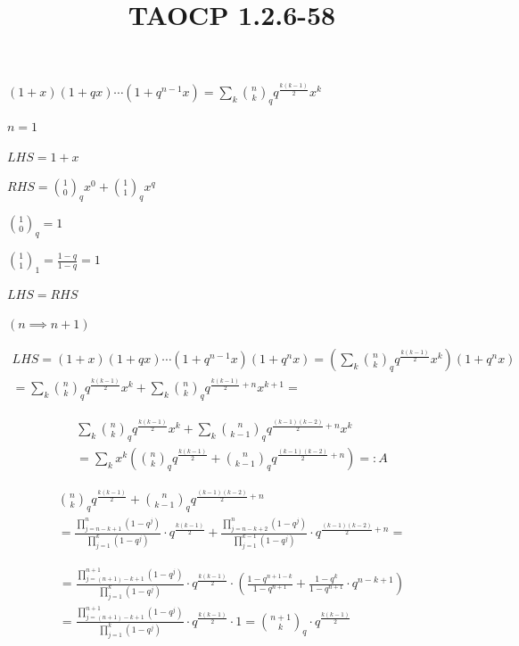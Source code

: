 \documentclass{article}
\title{TAOCP 1.2.6\mbox{-}58}
\begin{document}
\maketitle

\( (1+x)(1+qx)\cdots(1+q^{n-1}x) = \sum_{k} \binom{n}{k}_{q} q^{\frac{k(k-1)}{2}} x^{k} \)

\( n = 1 \)

\( LHS = 1 + x \)

\( RHS = \binom{1}{0}_{q} x^{0} + \binom{1}{1}_{q} x^{q} \)

\( \binom{1}{0}_{q} = 1 \)

\( \binom{1}{1}_{1} = \frac{1-q}{1-q} = 1 \)

\( LHS = RHS \)

\( (n \implies n + 1) \)

\begin{multline*}
LHS = (1+x)(1+qx)\cdots(1+q^{n-1}x)(1+q^{n}x) = (\sum_{k} \binom{n}{k}_{q} q^{\frac{k(k-1)}{2}} x^{k})(1 + q^{n} x) \\
= \sum_{k} \binom{n}{k}_{q} q^{\frac{k(k-1)}{2}} x^{k} + \sum_{k} \binom{n}{k}_{q} q^{\frac{k(k-1)}{2}+n} x^{k+1} =
\end{multline*}

\begin{multline*}
\sum_{k} \binom{n}{k}_{q} q^{\frac{k(k-1)}{2}} x^{k} + \sum_{k} \binom{n}{k-1}_{q} q^{\frac{(k-1)(k-2)}{2}+n} x^{k} \\
= \sum_{k} x^{k}(\binom{n}{k}_{q} q^{\frac{k(k-1)}{2}} + \binom{n}{k-1}_{q} q^{\frac{(k-1)(k-2)}{2}+n}) =: A
\end{multline*}

\begin{multline*}
\binom{n}{k}_{q} q^{\frac{k(k-1)}{2}} + \binom{n}{k-1}_{q} q^{\frac{(k-1)(k-2)}{2}+n} \\
= \frac{\prod_{j=n-k+1}^{n} (1-q^{j})}{\prod_{j=1}^{k} (1-q^{j})} \cdot q^{\frac{k(k-1)}{2}} + \frac{\prod_{j=n-k+2}^{n} (1-q^{j})}{\prod_{j=1}^{k-1} (1-q^{j})} \cdot q^{\frac{(k-1)(k-2)}{2} + n} =
\end{multline*}

\begin{multline*}
= \frac{\prod_{j=(n+1)-k+1}^{n+1} (1-q^{j})}{\prod_{j=1}^{k} (1-q^{j})} \cdot q^{\frac{k(k-1)}{2}} \cdot (\frac{1-q^{n+1-k}}{1-q^{n+1}} + \frac{1-q^{k}}{1-q^{n+1}}\cdot q^{n-k+1}) \\
= \frac{\prod_{j=(n+1)-k+1}^{n+1} (1-q^{j})}{\prod_{j=1}^{k} (1-q^{j})} \cdot q^{\frac{k(k-1)}{2}} \cdot 1 = \binom{n+1}{k}_{q} \cdot q^{\frac{k(k-1)}{2}}
\end{multline*}
\end{document}
